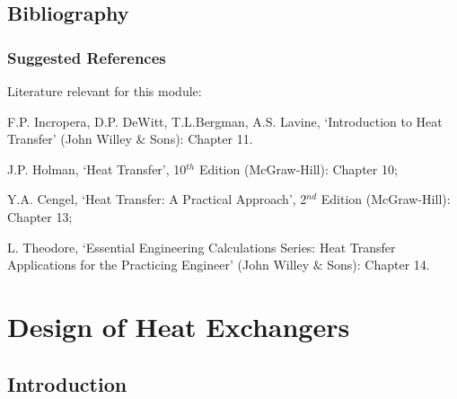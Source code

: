 \documentclass[10pt,compress,unknownkeysallowed]{beamer}
\begin{document}
\subsection{Bibliography} 

\begin{frame}
 \frametitle{Suggested References}
  Literature relevant for this module:
  \begin{enumerate}[{[}1{]}]
    \item F.P. Incropera, D.P. DeWitt, T.L.Bergman, A.S. Lavine, `Introduction to Heat Transfer' (John Willey $\&$ Sons): Chapter 11.
    \item J.P. Holman, `Heat Transfer', 10$^{th}$ Edition (McGraw-Hill): Chapter 10;
    \item Y.A. Cengel, `Heat Transfer: A Practical Approach', 2$^{nd}$ Edition (McGraw-Hill): Chapter 13;
    \item L. Theodore, `Essential Engineering Calculations Series: Heat Transfer Applications for the Practicing Engineer' (John Willey $\&$ Sons): Chapter 14.
  \end{enumerate}
\end{frame}

\section{Design of Heat Exchangers}

\subsection{Introduction}
\end{document}
